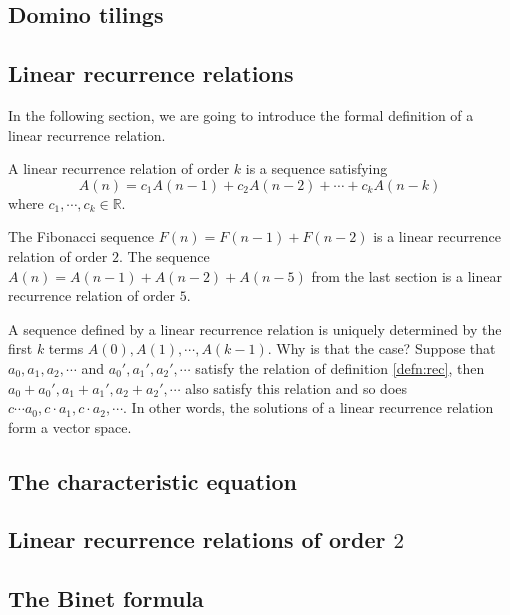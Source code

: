 \subsection{Domino tilings}

\subsection{Linear recurrence relations}

In the following section, we are going to introduce the formal definition of a linear recurrence relation.

\begin{defn}
A linear recurrence relation of order $k$ is a sequence satisfying 
$$
A(n)=c_1A(n-1)+c_2A(n-2)+\cdots+c_kA(n-k)
$$
where $c_1,\cdots, c_k \in \mathbb{R}$.
\label{defn:rec}
\end{defn}

\begin{exmp}
The Fibonacci sequence $F(n)=F(n-1)+F(n-2)$ is a linear recurrence relation of order $2$. The sequence
$A(n)=A(n-1)+A(n-2)+A(n-5)$ from the last section is a linear recurrence relation of order $5$.
\end{exmp}

\begin{remark}
A sequence defined by a linear recurrence relation is uniquely determined by the first $k$ terms $A(0), A(1), \cdots, A(k-1)$.
Why is that the case? Suppose that $a_0, a_1, a_2, \cdots$ and $a_0', a_1', a_2', \cdots$ satisfy the relation of definition \ref{defn:rec},
then $a_0+a_0', a_1+a_1',a_2+a_2', \cdots$ also satisfy this relation and so does $c \cdots a_0, c \cdot a_1, c \cdot a_2, \cdots$.
In other words, the solutions of a linear recurrence relation form a vector space.
\end{remark}

\subsection[The characteristic equation]{The characteristic equation}

\subsection{Linear recurrence relations of order $2$}

\subsection{The Binet formula}

